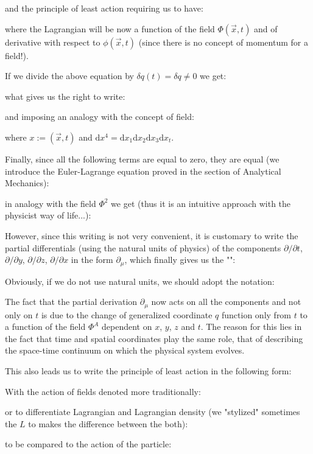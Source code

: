 	and the principle of least action requiring us to have:
	
	where the Lagrangian will be now a function of the field $\Phi(\vec{x},t)$ and of derivative with respect to $\phi(\vec{x},t)$ (since there is no concept of momentum for a field!).
	
	If we divide the above equation by $\delta q(t)=\delta q\neq 0$ we get:
	
	what gives us the right to write:
	
	and imposing an analogy with the concept of field:
	
	where $x:=(\vec{x},t)$ and $\mathrm{d}x^4=\mathrm{d}x_1\mathrm{d}x_2\mathrm{d}x_3\mathrm{d}x_t$.
	
	Finally, since all the following terms are equal to zero, they are equal (we introduce the Euler-Lagrange equation proved in the section of Analytical Mechanics):
	
	in analogy with the field $\Phi^2$ we get (thus it is an intuitive approach with the physicist way of life...):
	
	However, since this writing is not very convenient, it is customary to write the partial differentials (using the natural units of physics) of the components $\partial/\partial t$, $\partial/\partial y$, $\partial / \partial z$, $\partial / \partial x$ in the form $\partial_\mu$, which finally gives us the "\label{lagrangian field equations}":
	
	Obviously, if we do not use natural units, we should adopt the notation:
	
	The fact that the partial derivation $\partial_\mu$ now acts on all the components and not only on $t$ is due to the change of generalized coordinate $q$ function only from $t$ to a function of the field $\Phi^A$ dependent on $x$, $y$, $z$ and $t$. The reason for this lies in the fact that time and spatial coordinates play the same role, that of describing the space-time continuum on which the physical system evolves.

	This also leads us to write the principle of least action in the following form:
	
	With the action of fields denoted more traditionally:
	
	or to differentiate Lagrangian and Lagrangian density \label{lagrangian density} (we "stylized" sometimes the $L$ to makes the difference between the both):
	
	to be compared to the action of the particle:
	
